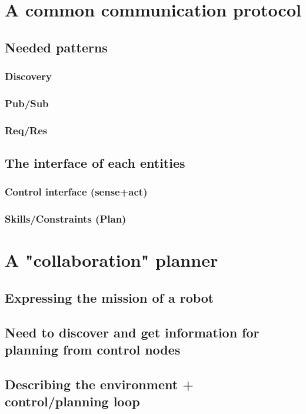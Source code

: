 \documentclass[conference]{IEEEtran}
\begin{document}
\section{A common communication protocol}

\subsection{Needed patterns}
\subsubsection{Discovery}
\subsubsection{Pub/Sub}
\subsubsection{Req/Res}

\subsection{The interface of each entities}
\subsubsection{Control interface (sense+act)}
\subsubsection{Skills/Constraints (Plan)}

\section{A "collaboration" planner}

\subsection{Expressing the mission of a robot}
\subsection{Need to discover and get information for planning from control nodes}
\subsection{Describing the environment + control/planning loop}

\end{document}

